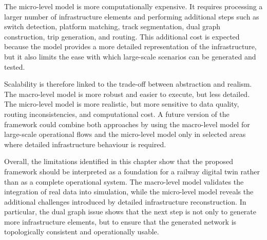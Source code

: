 The micro-level model is more computationally expensive. It requires processing a larger number of infrastructure elements 
and performing additional steps such as switch detection, platform matching, track segmentation, dual graph construction, 
trip generation, and routing. This additional cost is expected because the model provides a more detailed representation of 
the infrastructure, but it also limits the ease with which large-scale scenarios can be generated and tested.

Scalability is therefore linked to the trade-off between abstraction and realism. The macro-level model is more robust and 
easier to execute, but less detailed. The micro-level model is more realistic, but more sensitive to data quality, routing 
inconsistencies, and computational cost. A future version of the framework could combine both approaches by using the 
macro-level model for large-scale operational flows and the micro-level model only in selected areas where detailed 
infrastructure behaviour is required.

Overall, the limitations identified in this chapter show that the proposed framework should be interpreted as a foundation 
for a railway digital twin rather than as a complete operational system. The macro-level model validates the integration 
of real data into simulation, while the micro-level model reveals the additional challenges introduced by detailed 
infrastructure reconstruction. In particular, the dual graph issue shows that the next step is not only to generate more 
infrastructure elements, but to ensure that the generated network is topologically consistent and operationally usable.